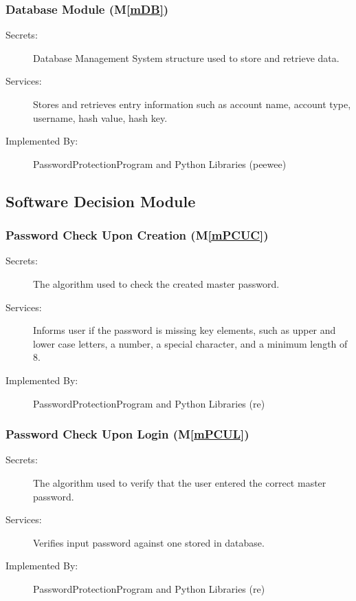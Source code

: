 \documentclass[12pt, titlepage]{article}
\newcommand{\mref}[1]{M\ref{#1}}
\begin{document}
\subsubsection{Database Module (\mref{mDB})}

\begin{description}
\item[Secrets:] Database Management System structure used to store and retrieve data.
\item[Services:] Stores and retrieves entry information such as account name, account type, username, hash value, hash key.
\item[Implemented By:] PasswordProtectionProgram and Python Libraries (peewee)
\end{description}


\subsection{Software Decision Module}

\subsubsection{Password Check Upon Creation (\mref{mPCUC})}

\begin{description}
\item[Secrets:] The algorithm used to check the created master password.
\item[Services:] Informs user if the password is missing key elements, such as upper and lower case letters, a number, a special character, and a minimum length of 8.
\item[Implemented By:] PasswordProtectionProgram and Python Libraries (re)
\end{description}

\subsubsection{Password Check Upon Login (\mref{mPCUL})}

\begin{description}
\item[Secrets:] The algorithm used to verify that the user entered the correct master password.
\item[Services:] Verifies input password against one stored in database.
\item[Implemented By:] PasswordProtectionProgram and Python Libraries (re)
\end{description}
\end{document}
